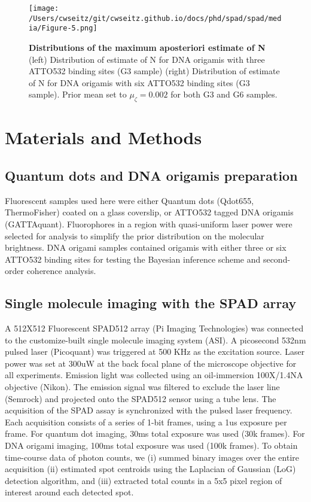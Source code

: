 \clearpage
\begin{figure}
\centering
\texttt{[image: /Users/cwseitz/git/cwseitz.github.io/docs/phd/spad/spad/media/Figure-5.png]}
\caption{\textbf{Distributions of the maximum aposteriori estimate of N} (left) Distribution of estimate of N for DNA origamis with three ATTO532 binding sites (G3 sample) (right) Distribution of estimate of N for DNA origamis with six ATTO532 binding sites (G3 sample). Prior mean set to $\mu_\zeta=0.002$ for both G3 and G6 samples.}
\label{fig:atto}
\end{figure}  

\section{Materials and Methods}

\subsection{Quantum dots and DNA origamis preparation }

Fluorescent samples used here were either Quantum dots (Qdot655, ThermoFisher) coated on a glass coverslip, or ATTO532 tagged DNA origamis (GATTAquant). Fluorophores in a region with quasi-uniform laser power were selected for analysis to simplify the prior distribution on the molecular brightness. DNA origami samples contained origamis with either three or six ATTO532 binding sites for testing the Bayesian inference scheme and second-order coherence analysis. 

\subsection{Single molecule imaging with the SPAD array}

A 512X512 Fluorescent SPAD512 array (Pi Imaging Technologies) was connected to the customize-built single molecule imaging system (ASI). A picosecond 532nm pulsed laser (Picoquant) was triggered at 500 KHz as the excitation source. Laser power was set at 300uW at the back focal plane of the microscope objective for all experiments. Emission light was collected using an oil-immersion 100X/1.4NA objective (Nikon). The emission signal was filtered to exclude the laser line (Semrock) and projected onto the SPAD512 sensor using a tube lens. The acquisition of the SPAD assay is synchronized with the pulsed laser frequency. Each acquisition consists of a series of 1-bit frames, using a 1us exposure per frame. For quantum dot imaging, 30ms total exposure was used (30k frames). For DNA origami imaging, 100ms total exposure was used (100k frames). To obtain time-course data of photon counts, we (i) summed binary images over the entire acquisition (ii) estimated spot centroids using the Laplacian of Gaussian (LoG) detection algorithm, and (iii) extracted total counts in a 5x5 pixel region of interest around each detected spot. 




